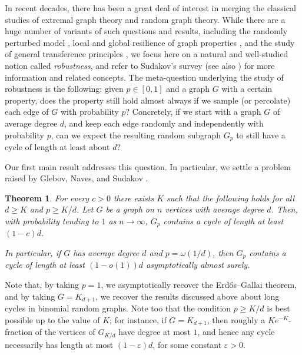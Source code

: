 \documentclass[10pt]{article}
\newtheorem{theorem}{Theorem}[section]
\theoremstyle{definition}
\let\geq\geqslant
\begin{document}
In recent decades, there has been a great deal of interest in merging the classical studies of extremal graph theory and random graph theory. While there are a huge number of variants of such questions and results, including the randomly perturbed model \cite{bohman2003many}, local and global resilience of graph properties \cite{lee2012dirac}, and the study of general transference principles \cite{conlon2016combinatorial,MR3548528}, we focus here on a natural and well-studied notion called \emph{robustness}, and refer to Sudakov's survey \cite{MR3728112} (see also \cite{krivelevich2014robust, kelly2024optimal}) for more information and related concepts. The meta-question underlying the study of robustness is the following: given $p\in[0,1]$ and a graph $G$ with a certain property, does the property still hold almost always if we sample (or percolate) each edge of $G$ with probability $p$? Concretely, if we start with a graph $G$ of average degree $d$, and keep each edge randomly and independently with probability $p$, can we expect the resulting random subgraph $G_p$ to still have a cycle of length at least about $d$? 

Our first main result addresses this question. In particular, we settle a problem raised by Glebov, Naves, and Sudakov \cite[Section 4]{glebov2017threshold}.
\begin{theorem}\label{thm: main}
    For every $c>0$ there exists $K$ such that the following holds for all $d\geq K$ and $p\geq K/d$. Let $G$ be a graph on $n$ vertices with average degree $d$. Then, with probability tending to $1$ as $n\to \infty$, $G_p$ contains a cycle of length at least $(1-c)d$.

    In particular, if $G$ has average degree $d$ and $p = \omega(1/d)$, then $G_p$ contains a cycle of length at least $(1-o(1))d$ asymptotically almost surely.
\end{theorem}
Note that, by taking $p=1$, we asymptotically recover the Erd\H os--Gallai theorem, and by taking $G=K_{d+1}$, we recover the results discussed above about long cycles in binomial random graphs. Note too that the condition $p \geq K/d$ is best possible up to the value of $K$; for instance, if $G=K_{d+1}$, then roughly a $Ke^{-K}$-fraction of the vertices of $G_{K/d}$ have degree at most $1$, and hence any cycle necessarily has length at most $(1-\varepsilon)d$, for some constant $\varepsilon>0$. 
\end{document}

